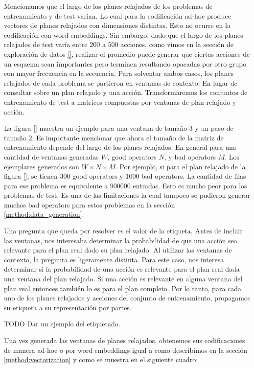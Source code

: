 Mencionamos que el largo de los planes relajados de los problemas de entrenamiento y de test varian. Lo cual para la codificación ad-hoc produce vectores de planes relajados con dimensiones distintas. Esto no ocurre en la codificación con word embeddings. Sin embargo, dado que el largo de los planes relajados de test varía entre 200 a 500 acciones, como vimos en la sección de exploración de datos \ref{}, realizar el promedio puede generar que ciertas acciones de un esquema sean importantes pero terminen resultando opacadas por otro grupo con mayor frecuencia en la secuencia. Para solventar ambos casos, los planes relajados de cada problema se partieron en ventanas de contexto. En lugar de consultar sobre un plan relajado y una acción. Transformaremos los conjuntos de entrenamiento de test a matrices compuestas por ventanas de plan relajado y acción.

La figura \ref{} muestra un ejemplo para una ventana de tamaño 3 y un paso de tamaño 2. Es importante mencionar que ahora el tamaño de la matriz de entrenamiento depende del largo de los planes relajados. En general para una cantidad de ventanas generadas $W$, good operators $N$, y bad operators $M$. Los ejemplares generados son $W \times N \times M$. Por ejemplo, si para el plan relajado de la figura \ref{}, se tienen 300 good operators y 1000 bad operators. La cantidad de filas para ese problema es equivalente a $900000$ entradas. Esto es mucho peor para los problemas de test. Es una de las limitaciones la cual tampoco se pudieron generar muchos bad operators para estos problemas en la sección \ref{method:data_generation}.

Una pregunta que queda por resolver es el valor de la etiqueta. Antes de incluir las ventanas, nos interesaba determinar la probabilidad de que una acción sea relevante para el plan real dado su plan relajado. Al utilizar las ventanas de contexto, la pregunta es ligeramente distinta. Para este caso, nos interesa determinar si la probabilidad de una acción es relevante para el plan real dada una ventana del plan relajado. Si una acción es relevante en alguna ventana del plan real entonces también lo es para el plan completo. Por lo tanto, para cada uno de los planes relajados y acciones del conjunto de entrenamiento, propagamos su etiqueta a su representación por partes.

TODO Dar un ejemplo del etiquetado.

Una vez generada las ventanas de planes relajados, obtenemos sus codificaciones de manera ad-hoc o por word embeddings igual a como describimos en la sección \ref{method:vectorization} y como se muestra en el siguiente cuadro:

